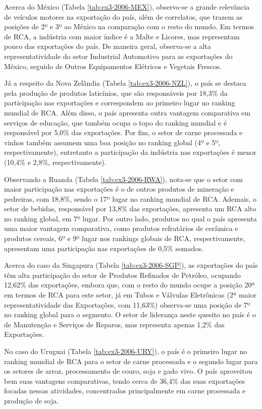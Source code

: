 Acerca do México (Tabela \ref{tab:ex3-2006-MEX}), observa-se a grande relevância de veículos motores na exportação do país, além de correlatos, que trazem as posições de 2º e 3º ao México na comparação com o resto do mundo. Em termos de RCA, a indústria com maior índice é a Malte e Licores, mas representam pouco das exportações do país. De maneira geral, observa-se a alta representatividade do setor Industrial Automotivo para as exportações do México, seguido de Outros Equipamentos Elétricos e Vegetais Frescos.

Já a respeito da Nova Zelândia (Tabela \ref{tab:ex3-2006-NZL}), o país se destaca pela produção de produtos laticínios, que são responsáveis por 18,3\% da participação nas exportações e correspondem ao primeiro lugar no ranking mundial de RCA. Além disso, o país apresenta outra vantagem comparativa em serviços de educação, que também ocupa o topo do ranking mundial e é responsável por 5,0\% das exportações. Por fim, o setor de carne processada e vinhos também assumem uma boa posição no ranking global (4º e 5º, respectivamente), entretanto a participação da indústria nas exportações é menor (10,4\% e 2,8\%, respectivamente).

Observando a Ruanda (Tabela \ref{tab:ex3-2006-RWA}), nota-se que o setor com maior participação nas exportações é o de outros produtos de mineração e pedreiras, com 18,8\%, sendo o 17º lugar no ranking mundial de RCA. Ademais, o setor de bebidas, responsável por 13,8\% das exportações, apresenta um RCA alto no ranking global, em 7º lugar. Por outro lado, produtos no qual o país apresenta uma maior vantagem comparativa, como produtos refratários de cerâmica e produtos cereais, 6º e 9º lugar nos rankings globais de RCA, respectivamente, apresentam uma participação nas exportações de 0,5\% somados.

Acerca do caso da Singapura (Tabela \ref{tab:ex3-2006-SGP}), as exportações do país têm alta participação do setor de Produtos Refinados de Petróleo, ocupando 12,62\% das exportações, embora que, com o resto do mundo ocupe a posição 20ª em termos de RCA para este setor, já em Tubos e Válvulas Eletrônicas (2ª maior representatividade das Exportações, com 11,63\%) observa-se uma posição de 7º no ranking global para o segmento. O setor de liderança neste quesito no país é o de Manutenção e Serviços de Reparos, mas representa apenas 1,2\% das Exportações.

No caso do Uruguai (Tabela \ref{tab:ex3-2006-URY}), o país é o primeiro lugar no ranking mundial de RCA para o setor de carne processada e o segundo lugar para os setores de arroz, processamento de couro, soja e gado vivo. O país aproveitou bem suas vantagens comparativas, tendo cerca de 36,4\% das suas exportações focadas nessas atividades, concentrados principalmente em carne processada e produção de soja.

